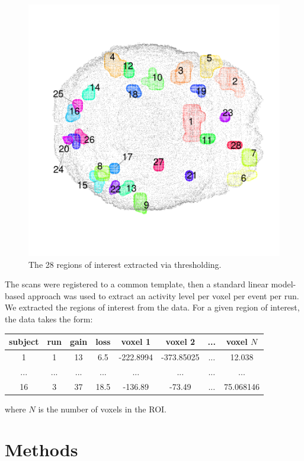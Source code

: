 \documentclass[12pt]{article}
\begin{document}
\begin{figure}[h]
\includegraphics[scale = 0.12]{../a7plots/all_rois_view3.png}
\caption{The 28 regions of interest extracted via thresholding.}
\end{figure}

The scans were registered to a common template, then a standard linear model-based approach
was used to extract an activity level per voxel per event per run.
We extracted the regions of interest from the data.  For a given region of interest, the data takes the form:

\begin{tabular}{|c|c|c|c||c|c|c|c|}
\hline
subject & run & gain & loss & voxel 1 & voxel 2 & ... & voxel $N$ \\
\hline
 1 & 1 & 13 &  6.5 & -222.8994 &  -373.85025 & ... & 12.038\\
... & ... & ... & ... & ... & ... & ... & ...\\
16 & 3 & 37 & 18.5 & -136.89 & -73.49 & ... & 75.068146 \\
\hline
\end{tabular}

where $N$ is the number of voxels in the ROI.

\section{Methods}
\end{document}
